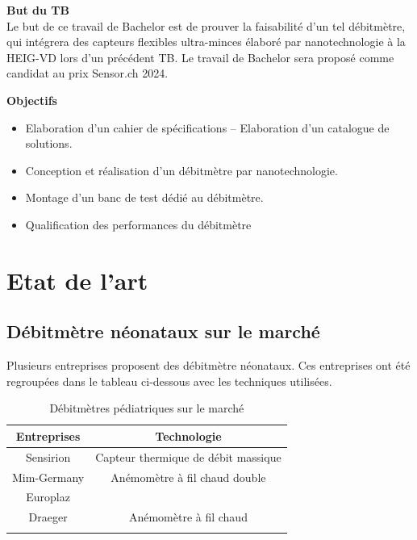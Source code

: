 \textbf{But du TB}\\
Le but de ce travail de Bachelor est de prouver la faisabilité d’un tel débitmètre, qui intégrera des capteurs flexibles ultra-minces 
élaboré par nanotechnologie à la HEIG-VD lors d'un précédent TB. Le travail de Bachelor sera proposé comme candidat au prix Sensor.ch 2024.

\textbf{Objectifs}
\begin{itemize}
    \item Elaboration d’un cahier de spécifications – Elaboration d’un catalogue de solutions.
    \item Conception et réalisation d’un débitmètre par nanotechnologie.
    \item Montage d’un banc de test dédié au débitmètre.
    \item Qualification des performances du débitmètre
\end{itemize}

\section{Etat de l'art}
\subsection{Débitmètre néonataux sur le marché}

Plusieurs entreprises proposent des débitmètre néonataux. Ces entreprises ont été regroupées dans le tableau ci-dessous avec les 
techniques utilisées. \\

\begin{table}[H]
    \centering
    \begin{tabular}{|c|c|}
        \hline
        Entreprises & Technologie                         \\
        \hline
        Sensirion   & Capteur thermique de débit massique \\
        \hline
        Mim-Germany & Anémomètre à fil chaud double       \\
        \hline
        Europlaz    &                                     \\
        \hline
        Draeger     & Anémomètre à fil chaud              \\
        \hline
        \label{tab:marques}
    \end{tabular}
    \caption{Débitmètres pédiatriques sur le marché}
    \label{tab:debitmetreMarche}
\end{table}


